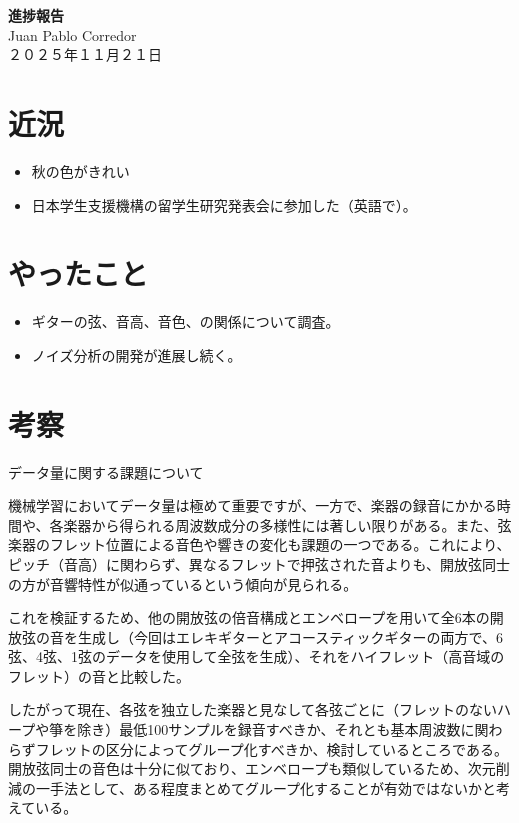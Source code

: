 \documentclass[a4paper, 11pt]{article}
\begin{document}
\begin{center}
    {\LARGE \bfseries 進捗報告} \\ %
    \vspace{0.3em} %
    Juan Pablo Corredor \\ %
    ２０２５年１１月２１日 %
\end{center}
\vspace{0.5em} %

\section*{近況}
\begin{itemize}
    \item 秋の色がきれい
    \item 日本学生支援機構の留学生研究発表会に参加した（英語で）。
\end{itemize} 

\section*{やったこと}
\begin{itemize} 
    \item ギターの弦、音高、音色、の関係について調査。\cite{GuitarStrings}
    \item ノイズ分析の開発が進展し続く。
\end{itemize}

\section*{考察}

データ量に関する課題について

機械学習においてデータ量は極めて重要ですが、一方で、楽器の録音にかかる時間や、各楽器から得られる周波数成分の多様性には著しい限りがある。また、弦楽器のフレット位置による音色や響きの変化も課題の一つである。これにより、ピッチ（音高）に関わらず、異なるフレットで押弦された音よりも、開放弦同士の方が音響特性が似通っているという傾向が見られる。

これを検証するため、他の開放弦の倍音構成とエンベロープを用いて全6本の開放弦の音を生成し（今回はエレキギターとアコースティックギターの両方で、6弦、4弦、1弦のデータを使用して全弦を生成）、それをハイフレット（高音域のフレット）の音と比較した。

したがって現在、各弦を独立した楽器と見なして各弦ごとに（フレットのないハープや箏を除き）最低100サンプルを録音すべきか、それとも基本周波数に関わらずフレットの区分によってグループ化すべきか、検討しているところである。開放弦同士の音色は十分に似ており、エンベロープも類似しているため、次元削減の一手法として、ある程度まとめてグループ化することが有効ではないかと考えている。 
\end{document}
